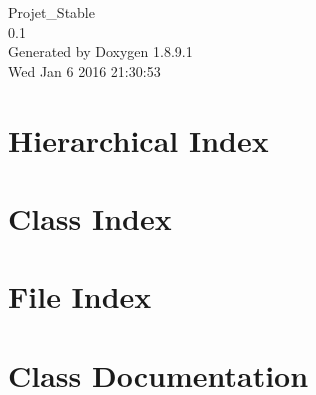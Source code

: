 \documentclass[twoside]{book}
\newcommand{\+}{\discretionary{\mbox{\scriptsize$\hookleftarrow$}}{}{}}
\newcommand{\clearemptydoublepage}{%
  \newpage{\pagestyle{empty}\cleardoublepage}%
}
\begin{document}
\hypersetup{pageanchor=false,
             bookmarks=true,
             bookmarksnumbered=true,
             pdfencoding=unicode
            }
\begin{titlepage}
\vspace*{7cm}
\begin{center}%
{\Large Projet\+\_\+\+Stable \\[1ex]\large 0.\+1 }\\
\vspace*{1cm}
{\large Generated by Doxygen 1.8.9.1}\\
\vspace*{0.5cm}
{\small Wed Jan 6 2016 21:30:53}\\
\end{center}
\end{titlepage}
\clearemptydoublepage
\tableofcontents
\clearemptydoublepage
{}
\hypersetup{pageanchor=true}

\chapter{Hierarchical Index}

\chapter{Class Index}

\chapter{File Index}

\chapter{Class Documentation}














\end{document}

